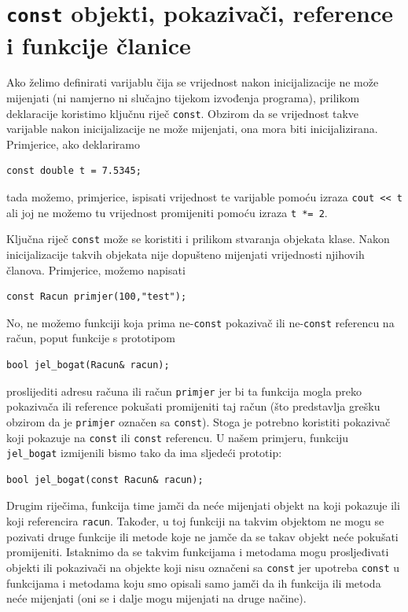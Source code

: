 \section{\texttt{const} objekti, pokazivači, reference
i funkcije članice}


Ako želimo definirati varijablu čija se vrijednost nakon inicijalizacije ne može mijenjati (ni namjerno ni slučajno tijekom izvođenja programa), prilikom deklaracije koristimo ključnu riječ \texttt{const}.
Obzirom da se vrijednost takve varijable nakon inicijalizacije ne može
mijenjati, ona mora biti inicijalizirana.
Primjerice, ako deklariramo
\begin{verbatim}
const double t = 7.5345;
\end{verbatim}
tada možemo, primjerice, ispisati vrijednost te varijable
pomoću izraza \texttt{cout <\!< t}
ali joj ne možemo tu vrijednost promijeniti pomoću izraza \texttt{t *= 2}.
\medskip

Ključna riječ \texttt{const} može se koristiti i prilikom stvaranja objekata klase. 
Nakon inicijalizacije takvih objekata nije dopušteno mijenjati vrijednosti njihovih članova.
Primjerice, možemo napisati
\begin{verbatim}
const Racun primjer(100,"test");
\end{verbatim}
No, ne možemo funkciji koja prima ne-\texttt{const} pokazivač ili 
ne-\texttt{const} referencu
na račun, poput funkcije s prototipom
\begin{verbatim}
bool jel_bogat(Racun& racun);
\end{verbatim}
proslijediti adresu računa ili račun \texttt{primjer}
jer bi ta funkcija mogla preko pokazivača
ili reference pokušati promijeniti taj račun
(što predstavlja grešku obzirom da je \texttt{primjer} označen sa \texttt{const}).
Stoga je potrebno koristiti pokazivač koji pokazuje na \texttt{const}
ili \texttt{const} referencu.
U našem primjeru, funkciju \texttt{jel\_bogat}
izmijenili bismo tako da ima sljedeći prototip:
\begin{verbatim}
bool jel_bogat(const Racun& racun);
\end{verbatim}
Drugim riječima, funkcija time jamči da neće mijenjati objekt na koji 
pokazuje ili koji referencira \texttt{racun}.
Također, u toj funkciji na takvim objektom ne mogu se
pozivati druge funkcije ili metode koje ne jamče da se takav objekt neće pokušati promijeniti.
Istaknimo da se takvim funkcijama i metodama mogu prosljeđivati
objekti ili pokazivači na objekte koji nisu označeni sa \texttt{const}
jer upotreba \texttt{const} u funkcijama i metodama koju
smo opisali samo jamči da ih funkcija ili metoda neće mijenjati
(oni se i dalje mogu mijenjati na druge načine).
\medskip

